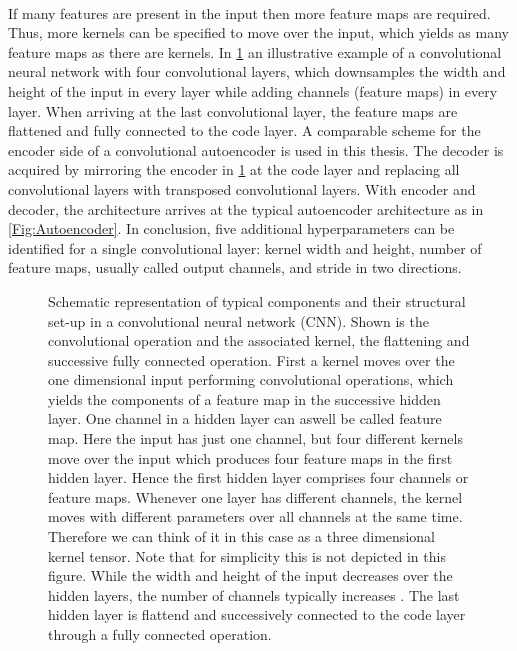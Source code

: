\\
If many features are present in the input then more feature maps are required. Thus, more kernels can be specified to move over the input, which yields as many feature maps as there are kernels. In \cref{Fig: Kernel} an illustrative example of a convolutional neural network with four convolutional layers, which downsamples the width and height of the input in every layer while adding channels (feature maps) in every layer. When arriving at the last convolutional layer, the feature maps are flattened and fully connected to the code layer. A comparable scheme for the encoder side of a convolutional autoencoder is used in this thesis. The decoder is acquired by mirroring the encoder in \cref{Fig: Kernel} at the code layer and replacing all convolutional layers with transposed convolutional layers.  With encoder and decoder, the architecture arrives at the typical autoencoder architecture as in \cref{Fig:Autoencoder}. In conclusion, five additional hyperparameters can be identified for a single convolutional layer: kernel width and height, number of feature maps, usually called output channels, and stride in two directions.\\
\begin{figure}
	\centering
	
	\caption{\footnotesize Schematic representation of typical components and their structural set-up in a convolutional neural network (CNN). Shown is the convolutional operation and the associated kernel, the flattening and successive fully connected operation. First a kernel moves over the one dimensional input performing convolutional operations, which yields the components of a feature map in the successive hidden layer. One channel in a hidden layer can aswell be called feature map. Here the input has just one channel, but four different kernels move over the input which produces four feature maps in the first hidden layer. Hence the first hidden layer comprises four channels or feature maps. Whenever one layer has different channels, the kernel moves with different parameters over all channels at the same time. Therefore we can think of it in this case as a three dimensional kernel tensor. Note that for simplicity this is not depicted in this figure. While the width and height of the input decreases over the hidden layers, the number of channels typically increases . The last hidden layer is flattend and successively connected to the code layer through a fully connected operation.}
	\label{Fig: Kernel}
\end{figure}\noindent
